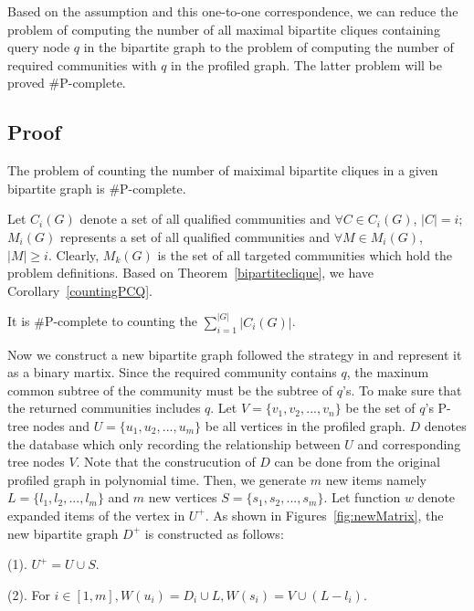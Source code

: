 Based on the assumption and this one-to-one correspondence, we can reduce the problem of computing the number of all maximal bipartite cliques containing query node $q$ in the bipartite graph to the problem of computing the number of required communities with $q$ in the profiled graph. The latter problem will be proved $\#$P-complete. 


\subsection{Proof}
 \begin{theorem}
\label{bipartiteclique}
The problem of counting the number of maiximal bipartite cliques in a given bipartite graph is $\#$P-complete.
\end{theorem}

Let $C_i(G)$ denote a set of all qualified communities and $\forall C \in C_i(G)$, $|C|=i$; $M_i(G)$ represents a set of all qualified communities and $\forall M \in M_i(G)$, $|M|\geq i$. Clearly, $M_k(G)$ is the set of all targeted communities which hold the problem definitions.
Based on Theorem~\ref{bipartiteclique}, we have Corollary~\ref{countingPCQ}. 

\begin{corollary}
\label{countingPCQ}
It is $\#$P-complete to counting the $\sum_{i=1}^{|G|}{|C_i(G)|}$.
\end{corollary}

Now we construct a new bipartite graph followed the strategy in \cite{yang2004complexity} and represent it as a binary martix. 
Since the required community contains $q$, the maxinum common subtree of the community must be the subtree of $q$'s. To make sure that the returned communities includes $q$. Let $V=\{v_1,v_2,...,v_n\}$ be the set of $q$'s P-tree nodes and $U=\{u_1,u_2,...,u_m\}$ be all vertices in the profiled graph. $D$ denotes the database which only recording the relationship between $U$ and corresponding tree nodes $V$. Note that the construcution of $D$ can be done from the original profiled graph in polynomial time. Then, we generate $m$ new items namely $L=\{l_1,l_2,...,l_m\}$ and $m$ new vertices $S=\{s_1,s_2,...,s_m\}$. Let function $w$ denote expanded items of the vertex in $U^+$. As shown in Figures~\ref{fig:newMatrix}, the new bipartite graph $D^+$ is constructed as follows: 

(1). $U^+=U \cup S$. 

(2). For $i\in [1,m], W(u_i)=D_i \cup L, W(s_i)=V \cup (L-{l_i})$. 

